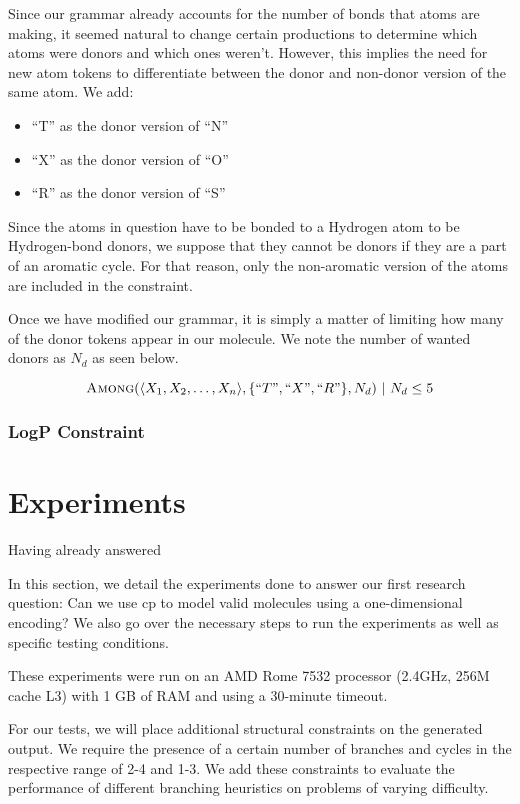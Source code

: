\documentclass[../Document.tex]{subfiles}
\begin{document}
Since our grammar already accounts for the number of bonds that atoms are making, it seemed natural to change certain productions to determine which atoms were donors and which ones weren't. However, this implies the need for new atom tokens to differentiate between the donor and non-donor version of the same atom. We add:
\begin{itemize}
    \item ``T'' as the donor version of ``N''
    \item ``X'' as the donor version of ``O''
    \item ``R'' as the donor version of ``S''
\end{itemize}

Since the atoms in question have to be bonded to a Hydrogen atom to be Hydrogen-bond donors, we suppose that they cannot be donors if they are a part of an aromatic cycle. For that reason, only the non-aromatic version of the atoms are included in the constraint.

Once we have modified our grammar, it is simply a matter of limiting how many of the donor tokens appear in our molecule. We note the number of wanted donors as $N_d$ as seen below.

$$
\mbox{\sc Among}(\langle X_1, X_2, \ldots, X_n \rangle, \{``T",``X",``R"\}, N_d)\ \vert\ N_d \leq 5
$$


\subsubsection{LogP Constraint}



\section{Experiments}
Having already answered 

In this section, we detail the experiments done to answer our first research question: Can we use \acrshort{cp} to model valid molecules using a one-dimensional encoding?
We also go over the necessary steps to run the experiments as well as specific testing conditions.

These experiments were run on an AMD Rome 7532 processor (2.4GHz, 256M cache L3) with 1 GB of RAM and using a 30-minute timeout.

For our tests, we will place additional structural constraints on the generated output. We require the presence of a certain number of branches and cycles in the respective range of 2-4 and 1-3. We add these constraints to evaluate the performance of different branching heuristics on problems of varying difficulty.
\end{document}
